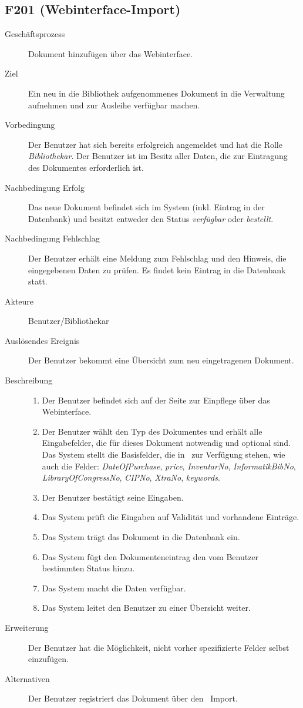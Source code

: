 \subsection{F201 (Webinterface-Import)}
\label{F:Web-Import}
\begin{description}
  \item[Geschäftsprozess]Dokument hinzufügen über das Webinterface.
  \item[Ziel]Ein neu in die Bibliothek aufgenommenes Dokument in die Verwaltung aufnehmen und zur Ausleihe verfügbar machen.
  \item[Vorbedingung]Der Benutzer hat sich bereits erfolgreich angemeldet und hat die Rolle \emph{Bibliothekar}. Der Benutzer ist im Besitz aller Daten, die zur Eintragung des Dokumentes erforderlich ist.
  \item[Nachbedingung Erfolg]Das neue Dokument befindet sich im System (inkl. Eintrag in der Datenbank) und besitzt entweder den Status \emph{verfügbar} oder \emph{bestellt}.
  \item[Nachbedingung Fehlschlag]Der Benutzer erhält eine Meldung zum Fehlschlag und den Hinweis, die eingegebenen Daten zu prüfen. Es findet kein Eintrag in die Datenbank statt.
  \item[Akteure]Benutzer/Bibliothekar
  \item[Auslösendes Ereignis]Der Benutzer bekommt eine Übersicht zum neu eingetragenen Dokument.
  \item[Beschreibung]\hfill
    \begin{enumerate}
      \item Der Benutzer befindet sich auf der Seite zur Einpflege über das Webinterface.
      \item Der Benutzer wählt den Typ des Dokumentes und erhält alle Eingabefelder, die für dieses Dokument notwendig und optional sind. Das System stellt die Basisfelder, die in \BibTeX\ zur Verfügung stehen, wie auch die Felder: \emph{DateOfPurchase}, \emph{price}, \emph{InventarNo}, \emph{InformatikBibNo}, \emph{LibraryOfCongressNo}, \emph{CIPNo}, \emph{XtraNo}, \emph{keywords}.
      \item Der Benutzer bestätigt seine Eingaben.
      \item Das System prüft die Eingaben auf Validität und vorhandene Einträge.
      \item Das System trägt das Dokument in die Datenbank ein.
      \item Das System fügt den Dokumenteneintrag den vom Benutzer bestimmten Status hinzu.
      \item Das System macht die Daten verfügbar.
      \item Das System leitet den Benutzer zu einer Übersicht weiter.
    \end{enumerate}
  \item[Erweiterung]Der Benutzer hat die Möglichkeit, nicht vorher spezifizierte Felder selbst einzufügen.
  \item[Alternativen]Der Benutzer registriert das Dokument über den \BibTeX\ Import.
\end{description}

